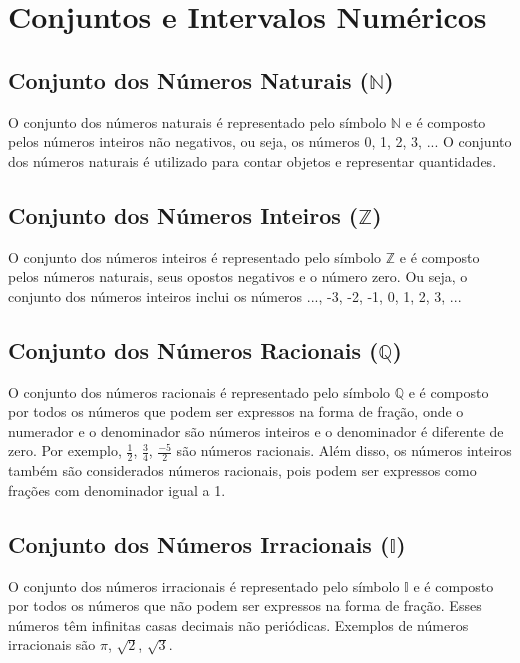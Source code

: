 \documentclass[12pt]{article}
\begin{document}
\pagebreak
\section{Conjuntos e Intervalos Numéricos}
\subsection{Conjunto dos Números Naturais (\texorpdfstring{$\mathbb{N}$}{N})}

O conjunto dos números naturais é representado pelo símbolo $\mathbb{N}$ e é composto pelos números inteiros não negativos, ou seja, os números 0, 1, 2, 3, ... O conjunto dos números naturais é utilizado para contar objetos e representar quantidades.

\subsection{Conjunto dos Números Inteiros (\texorpdfstring{$\mathbb{Z}$}{Z})}

O conjunto dos números inteiros é representado pelo símbolo $\mathbb{Z}$ e é composto pelos números naturais, seus opostos negativos e o número zero. Ou seja, o conjunto dos números inteiros inclui os números ..., -3, -2, -1, 0, 1, 2, 3, ...

\subsection{Conjunto dos Números Racionais (\texorpdfstring{$\mathbb{Q}$}{Q})}

O conjunto dos números racionais é representado pelo símbolo $\mathbb{Q}$ e é composto por todos os números que podem ser expressos na forma de fração, onde o numerador e o denominador são números inteiros e o denominador é diferente de zero. Por exemplo, $\frac{1}{2}$, $\frac{3}{4}$, $\frac{-5}{2}$ são números racionais. Além disso, os números inteiros também são considerados números racionais, pois podem ser expressos como frações com denominador igual a 1.

\subsection{Conjunto dos Números Irracionais (\texorpdfstring{$\mathbb{I}$}{I})}

O conjunto dos números irracionais é representado pelo símbolo $\mathbb{I}$ e é composto por todos os números que não podem ser expressos na forma de fração. Esses números têm infinitas casas decimais não periódicas. Exemplos de números irracionais são $\pi$, $\sqrt{2}$, $\sqrt{3}$.
\end{document}
